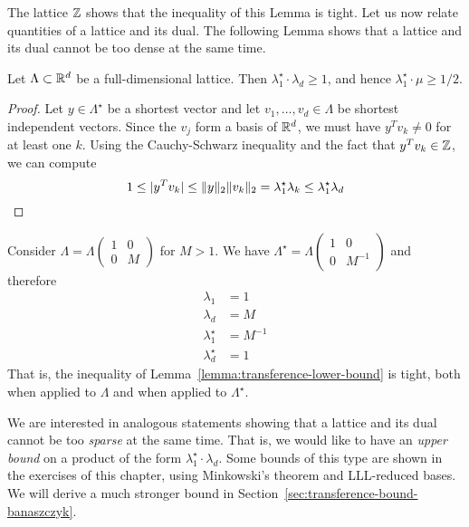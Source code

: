 The lattice $\mathbb{Z}$ shows that the inequality of this Lemma is tight.
Let us now relate quantities of a lattice and its dual.
The following Lemma shows that a lattice and its dual cannot be too dense at the same time.

\begin{lemma}
  \label{lemma:transference-lower-bound}
  Let $\Lambda \subset \mathbb{R}^d$ be a full-dimensional lattice.
  Then $\lambda_1^\star \cdot \lambda_d \geq 1$,
  and hence $\lambda_1^\star \cdot \mu \geq 1/2$.
\end{lemma}
\begin{proof}
  Let $y \in \Lambda^\star$ be a shortest vector
  and let $v_1, \ldots, v_d \in \Lambda$ be shortest independent vectors.
  Since the $v_j$ form a basis of $\mathbb{R}^d$,
  we must have $y^T v_k \neq 0$ for at least one $k$.
  Using the Cauchy-Schwarz inequality and the fact that $y^T v_k \in \mathbb{Z}$,
  we can compute
  \[
    1 \leq |y^T v_k| \leq \|y\|_2 \|v_k\|_2 = \lambda_1^\star \lambda_k \leq \lambda_1^\star \lambda_d \qedhere
  \]
\end{proof}

\begin{example}
  Consider $\Lambda = \Lambda \begin{pmatrix} 1 & 0 \\ 0 & M \end{pmatrix}$ for $M > 1$.
  We have $\Lambda^\star = \Lambda \begin{pmatrix} 1 & 0 \\ 0 & M^{-1} \end{pmatrix}$
  and therefore
  \begin{align*}
    \lambda_1 &= 1 \\
    \lambda_d &= M \\
    \lambda_1^\star &= M^{-1} \\
    \lambda_d^\star &= 1
  \end{align*}
  That is, the inequality of Lemma~\ref{lemma:transference-lower-bound} is tight,
  both when applied to $\Lambda$ and when applied to $\Lambda^\star$.
\end{example}

We are interested in analogous statements showing
that a lattice and its dual cannot be too \emph{sparse} at the same time.
That is, we would like to have an \emph{upper bound} on a product of the form $\lambda_1^\star \cdot \lambda_d$.
Some bounds of this type are shown in the exercises of this chapter,
using Minkowski's theorem and LLL-reduced bases.
We will derive a much stronger bound in Section~\ref{sec:transference-bound-banaszczyk}.



